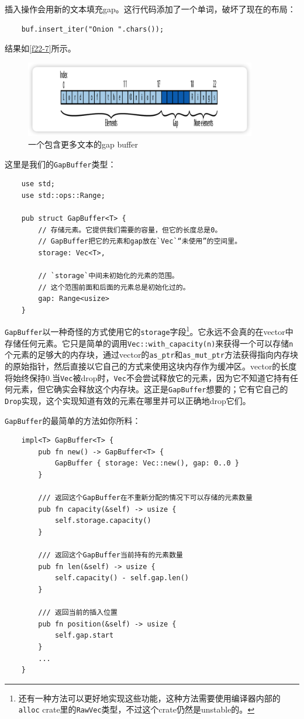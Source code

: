 插入操作会用新的文本填充gap。这行代码添加了一个单词，破坏了现在的布局：
\begin{verbatim}
    buf.insert_iter("Onion ".chars());
\end{verbatim}

结果如\autoref{f22-7}所示。

\begin{figure}[htbp]
    \centering
    \includegraphics[width=0.9\textwidth]{../img/f22-7.png}
    \caption{一个包含更多文本的gap buffer}
    \label{f22-7}
\end{figure}

这里是我们的\texttt{GapBuffer}类型：
\begin{verbatim}
    use std;
    use std::ops::Range;

    pub struct GapBuffer<T> {
        // 存储元素。它提供我们需要的容量，但它的长度总是0。
        // GapBuffer把它的元素和gap放在`Vec`“未使用”的空间里。
        storage: Vec<T>,

        // `storage`中间未初始化的元素的范围。
        // 这个范围前面和后面的元素总是初始化过的。
        gap: Range<usize>
    }
\end{verbatim}

\texttt{GapBuffer}以一种奇怪的方式使用它的\texttt{storage}字段\footnote{还有一种方法可以更好地实现这些功能，这种方法需要使用编译器内部的\texttt{alloc} crate里的\texttt{RawVec}类型，不过这个crate仍然是unstable的。}。它永远不会真的在vector中存储任何元素。它只是简单的调用\texttt{Vec::with\_capacity(n)}来获得一个可以存储\texttt{n}个元素的足够大的内存块，通过vector的\texttt{as\_ptr}和\texttt{as\_mut\_ptr}方法获得指向内存块的原始指针，然后直接以它自己的方式来使用这块内存作为缓冲区。vector的长度将始终保持0.当\texttt{Vec}被drop时，\texttt{Vec}不会尝试释放它的元素，因为它不知道它持有任何元素，但它确实会释放这个内存块。这正是\texttt{GapBuffer}想要的；它有它自己的\texttt{Drop}实现，这个实现知道有效的元素在哪里并可以正确地drop它们。

\texttt{GapBuffer}的最简单的方法如你所料：
\begin{verbatim}
    impl<T> GapBuffer<T> {
        pub fn new() -> GapBuffer<T> {
            GapBuffer { storage: Vec::new(), gap: 0..0 }
        }

        /// 返回这个GapBuffer在不重新分配的情况下可以存储的元素数量
        pub fn capacity(&self) -> usize {
            self.storage.capacity()
        }

        /// 返回这个GapBuffer当前持有的元素数量
        pub fn len(&self) -> usize {
            self.capacity() - self.gap.len()
        }

        /// 返回当前的插入位置
        pub fn position(&self) -> usize {
            self.gap.start
        }
        ...
    }
\end{verbatim}

